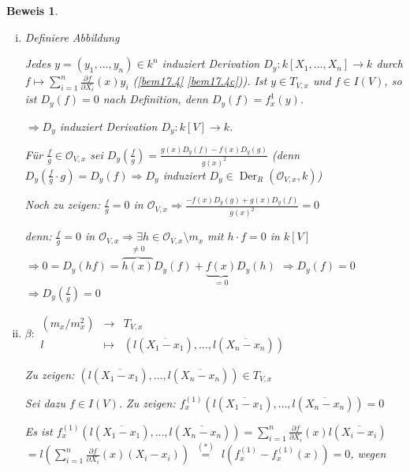 \documentclass[a4paper, 12pt, numbers=noendperiod, chapterprefix=true, headsepline]{scrbook}
\theoremstyle{break}
\theoremstyle{nonumberbreak}
\newtheorem{Bew}{Beweis}
\theoremstyle{nonumberplain}
\DeclareMathOperator{\Der}{Der}
\newcommand{\calO}{\mathcal{O}}
\newcommand{\FakRaum}[2]{
  \raisebox{0.7ex}{\ensuremath{#1}}
  \ensuremath{\mkern-3mu}\big/\ensuremath{\mkern-3mu}
  \raisebox{-0.6ex}{\ensuremath{#2}}}
\begin{document}
\begin{Bew}\begin{enumerate}[i)]
\item
	Definiere Abbildung\\ 
	\begin{center}\end{center}
	Jedes $y=(y_1,\ldots ,y_n)\in k^n$ induziert Derivation $D_y:k[X_1,\ldots ,X_n]\to k$ durch $f\mapsto\sum_{i=1}^n\frac{\partial f}{\partial X_i}(x)y_i$ (\ref{bem17.4} \ref{bem17.4c})). Ist $y \in T_{V,x}$ und $f\in I(V)$, so ist $D_y(f)=0$ nach Definition, denn $D_y(f)=f_x^1(y)$.
	
	$\Rightarrow D_y$ induziert Derivation $D_y:k[V]\to k$.
	
	F\"ur $\frac{f}{g}\in \calO_{V,x}$ sei $D_y(\frac{f}{g})=\frac{g(x)D_y(f)-f(x)D_y(g)}{g(x)^2}$ (denn $D_y(\frac{f}{g}\cdot g)=D_y(f) \Rightarrow D_y$ induziert $D_y\in \Der_R(\calO_{V,x},k)$)
	
	\emph{Noch zu zeigen:} $\frac{f}{g}=0$ in $\calO_{V,x}\Rightarrow \frac{-f(x)D_y(g)+g(x)D_y(f)}{g(x)^2}=0$
	
	\emph{denn:} $\frac{f}{g}=0$ in $\calO_{V,x} \Rightarrow \exists h\in \calO_{V,x}\setminus m_x$ mit $h\cdot f=0$ in $k[V]$ $\Rightarrow 0=D_y(hf)=\overbrace{h(x)}^{\ne0}D_y(f)+\underbrace{f(x)}_{=0}D_y(h)$ $\Rightarrow D_y(f)=0$ $\Rightarrow D_y(\frac{f}{g})=0$
\item
	$ \beta:\begin{array}{rcl}(m_x/m_x^2) &\to& T_{V,x}\\
	l &\mapsto& \left(l(\overline{X_1-x_1}),\ldots ,l(\overline{X_n-x_n})\right)\end{array}$
	
	\emph{Zu zeigen:} $\left(l(\overline{X_1-x_1}),\ldots ,l(\overline{X_n-x_n})\right) \in T_{V,x}$
	
	Sei dazu $f\in I(V)$. \emph{Zu zeigen:} $f_x^{(1)}\left(l(\overline{X_1-x_1}),\ldots ,l(\overline{X_n-x_n})\right)=0$
	
	Es ist $f_x^{(1)}\left(l(\overline{X_1-x_1}),\ldots ,l(\overline{X_n-x_n})\right)= \sum_{i=1}^n \frac{\partial f}{\partial X_i}(x)l(\overline{X_i-x_i})$ $= l\left(\sum_{i=1}^n \frac{\partial f}{\partial X_i}(x)(X_i-x_i)\right)$ $\overset{(*)}{=}$ $l\left( f_x^{(1)}-f_x^{(1)}(x) \right) = 0$, wegen
	

\end{enumerate}
\end{Bew}
\end{document}
